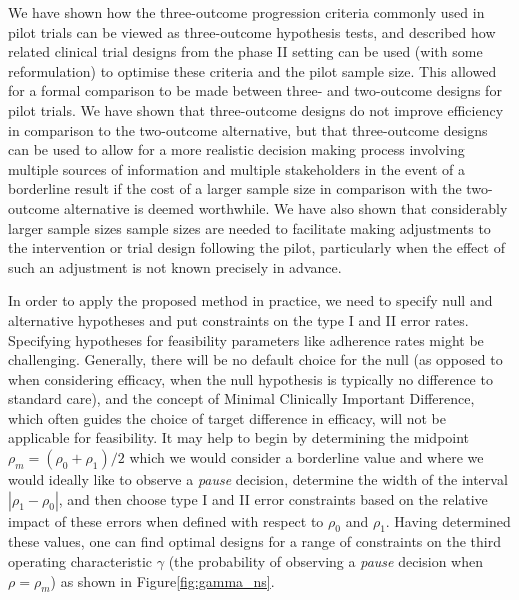 \documentclass{bmcart}
\begin{document}

We have shown how the three-outcome progression criteria commonly used in pilot trials can be viewed as three-outcome hypothesis tests, and described how related clinical trial designs from the phase II setting can be used (with some reformulation) to optimise these criteria and the pilot sample size. This allowed for a formal comparison to be made between three- and two-outcome designs for pilot trials. We have shown that three-outcome designs do not improve efficiency in comparison to the two-outcome alternative, but that three-outcome designs can be used to allow for a more realistic decision making process involving multiple sources of information and multiple stakeholders in the event of a borderline result if the cost of a larger sample size in comparison with the two-outcome alternative is deemed worthwhile. We have also shown that considerably larger sample sizes sample sizes are needed to facilitate making adjustments to the intervention or trial design following the pilot, particularly when the effect of such an adjustment is not known precisely in advance. 

In order to apply the proposed method in practice, we need to specify null and alternative hypotheses and put constraints on the type I and II error rates. Specifying hypotheses for feasibility parameters like adherence rates might be challenging. Generally, there will be no default choice for the null (as opposed to when considering efficacy, when the null hypothesis is typically no difference to standard care), and the concept of Minimal Clinically Important Difference, which often guides the choice of target difference in efficacy, will not be applicable for feasibility. It may help to begin by determining the midpoint $\rho_m = (\rho_0 + \rho_1)/2$ which we would consider a borderline value and where we would ideally like to observe a \emph{pause} decision, determine the width of the interval $|\rho_1 - \rho_0|$, and then choose type I and II error constraints based on the relative impact of these errors when defined with respect to $\rho_0$ and $\rho_1$. Having determined these values, one can find optimal designs for a range of constraints on the third operating characteristic $\gamma$ (the probability of observing a   \emph{pause} decision when $\rho = \rho_m$) as shown in Figure\ref{fig:gamma_ns}.
\end{document}

